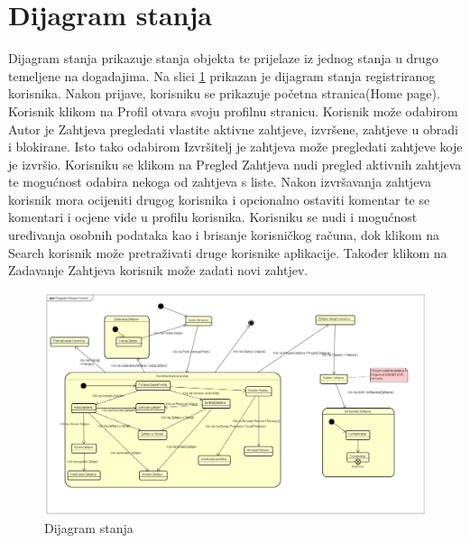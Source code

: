 			

\newpage			
\section{Dijagram stanja}
			
				
		
		\text Dijagram stanja prikazuje stanja objekta te prijelaze iz jednog stanja u drugo temeljene na dogadajima. Na slici
		\ref{fig:4.10} prikazan je dijagram stanja registriranog korisnika. Nakon prijave, korisniku se prikazuje početna stranica(Home page). Korisnik klikom na Profil otvara svoju profilnu stranicu. Korisnik može odabirom Autor je Zahtjeva pregledati vlastite aktivne zahtjeve, izvršene, zahtjeve u obradi i blokirane. Isto tako odabirom Izvršitelj je zahtjeva može pregledati zahtjeve koje je izvršio. Korisniku se klikom na Pregled Zahtjeva nudi pregled aktivnih zahtjeva te mogućnost odabira nekoga od zahtjeva s liste. Nakon izvršavanja zahtjeva korisnik mora ocijeniti drugog korisnika i opcionalno ostaviti komentar te se komentari i ocjene vide u profilu korisnika. Korisniku se nudi i mogućnost uređivanja osobnih podataka kao i brisanje korisničkog računa, dok klikom  na Search korisnik može pretraživati druge korisnike aplikacije. Također klikom na Zadavanje Zahtjeva korisnik može zadati novi zahtjev.
		
		\begin{figure}[H]
			\includegraphics[scale=0.3]{slike/Dijagram Stanja Korisnik.png} %
			\centering
			\caption { Dijagram stanja}
			\label{fig:4.10}
			\end{figure}		
			
